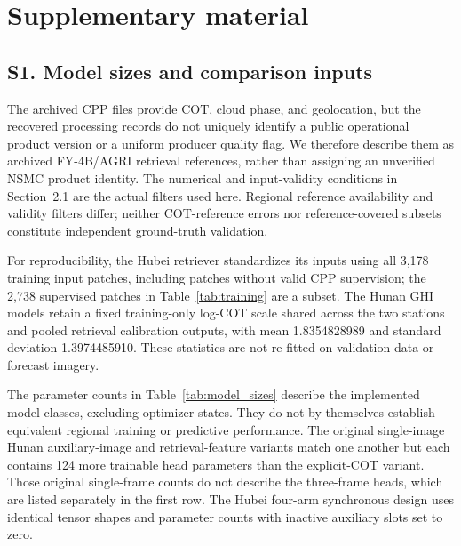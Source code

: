 \documentclass[11pt]{article}
\begin{document}
\section*{Supplementary material}
\setcounter{figure}{0}
\renewcommand{\thefigure}{S\arabic{figure}}
\setcounter{table}{0}
\renewcommand{\thetable}{S\arabic{table}}

\subsection*{S1. Model sizes and comparison inputs}
The archived CPP files provide COT, cloud phase, and geolocation, but the recovered processing records do not uniquely identify a public operational product version or a uniform producer quality flag. We therefore describe them as archived FY-4B/AGRI retrieval references, rather than assigning an unverified NSMC product identity. The numerical and input-validity conditions in Section~2.1 are the actual filters used here. Regional reference availability and validity filters differ; neither COT-reference errors nor reference-covered subsets constitute independent ground-truth validation.

For reproducibility, the Hubei retriever standardizes its inputs using all 3,178 training input patches, including patches without valid CPP supervision; the 2,738 supervised patches in Table~\ref{tab:training} are a subset. The Hunan GHI models retain a fixed training-only log-COT scale shared across the two stations and pooled retrieval calibration outputs, with mean 1.8354828989 and standard deviation 1.3974485910. These statistics are not re-fitted on validation data or forecast imagery.

The parameter counts in Table~\ref{tab:model_sizes} describe the implemented model classes, excluding optimizer states. They do not by themselves establish equivalent regional training or predictive performance. The original single-image Hunan auxiliary-image and retrieval-feature variants match one another but each contains 124 more trainable head parameters than the explicit-COT variant. Those original single-frame counts do not describe the three-frame heads, which are listed separately in the first row. The Hubei four-arm synchronous design uses identical tensor shapes and parameter counts with inactive auxiliary slots set to zero.
\end{document}
